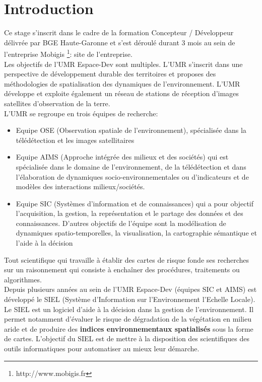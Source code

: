 \chapter{Introduction} 
\label{Introduction}

Ce stage s'inscrit dans le cadre de la formation Concepteur / Développeur délivrée par BGE Haute-Garonne et s'est déroulé durant 3 mois au sein de l'entreprise Mobigis \footnote{http://www.mobigis.fr}: site de l'entreprise.\\
 
Les objectifs de l'UMR Espace-Dev sont multiples. L'UMR s'inscrit dans une perspective de développement durable des territoires et proposes des méthodologies de spatialisation des dynamiques de l'environnement. L'UMR développe et exploite également un réseau de stations de réception d'images satellites d'observation de la terre.\\

L'UMR se regroupe en trois équipes de recherche: \\
\begin{itemize}
\item Equipe OSE (Observation spatiale de l'environnement), spécialisée dans la télédétection et les images satellitaires
\item Equipe AIMS (Approche intégrée des milieux et des sociétés) qui est spécialisée dans le domaine de l'environnement, de la  télédétection et dans l'élaboration de dynamiques socio-environnementales ou d'indicateurs et de modèles des interactions milieux/sociétés.
\item Equipe SIC (Systèmes d'information et de connaissances) qui a pour objectif l'acquisition, la gestion, la représentation et le partage des données et des connaissances. D'autres objectifs de l'équipe sont la modélisation de dynamiques spatio-temporelles, la visualisation, la cartographie sémantique et l'aide à la décision\\

\end{itemize}

Tout scientifique qui travaille à établir des cartes de risque fonde ses recherches sur un raisonnement qui consiste à enchaîner des procédures, traitements ou algorithmes. \\

Depuis plusieurs années  au sein de l'UMR Espace-Dev (équipes SIC et AIMS) est développé le SIEL (Système d'Information sur l'Environnement l'Echelle Locale). Le SIEL est un logiciel d'aide à la décision dans la gestion de l'environnement. Il permet notamment d'évaluer le risque de dégradation de la végétation en milieu aride et de produire des \textbf{indices environnementaux spatialisés} sous la forme de cartes. L'objectif du SIEL est de mettre à la disposition des scientifiques des outils informatiques pour automatiser au mieux leur démarche.\\


